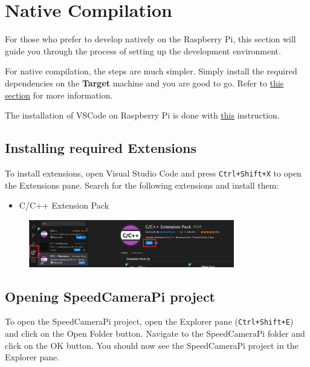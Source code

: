 \chapter{Native Compilation}

For those who prefer to develop natively on the Raspberry Pi, this section will guide you through the process of setting up the development environment.

For native compilation, the steps are much simpler. Simply install the required dependencies on the \textbf{Target} machine and you are good to go. Refer to \href{md_Docs_markdown_InstallingRequiredDependency.html}{this section} for more information.

The installation of VSCode on Raspberry Pi is done with \href{https://code.visualstudio.com/docs/setup/raspberry-pi}{this} instruction.

\section{Installing required Extensions}

To install extensions, open Visual Studio Code and press \texttt{Ctrl+Shift+X} to open the Extensions pane. Search for the following extensions and install them:

\begin{itemize}
      \item C/C++ Extension Pack
\end{itemize}

\begin{figure}[H]
      \centering
      \includegraphics[width=0.8\textwidth]{texs/chapter1/image/c++ext.png}
\end{figure}

\section{Opening SpeedCameraPi project}

To open the SpeedCameraPi project, open the Explorer pane (\texttt{Ctrl+Shift+E}) and click on the Open Folder button. Navigate to the SpeedCameraPi folder and click on the OK button. You should now see the SpeedCameraPi project in the Explorer pane.

